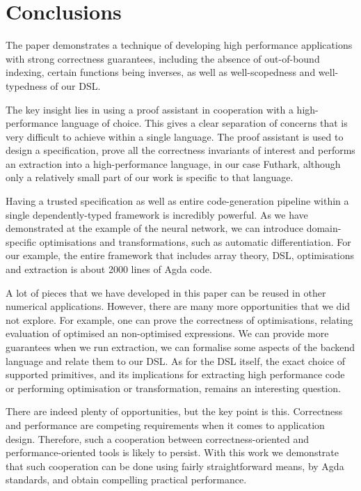 \section{Conclusions\label{sec:conclusions}}

The paper demonstrates a technique of developing high performance
applications with strong correctness guarantees, including the absence
of out-of-bound indexing, certain functions being inverses, as well as
well-scopedness and well-typedness of our DSL.

The key insight lies in using a proof assistant in cooperation with a
high-performance language of choice. This gives a clear separation of
concerns that is very difficult to achieve within a single language.
The proof assistant is used to design a specification, prove all the
correctness invariants of interest and performs an extraction into a
high-performance language, in our case Futhark, although only a
relatively small part of our work is specific to that language.

Having a trusted specification as well as entire code-generation
pipeline within a single dependently-typed framework is incredibly
powerful. As we have demonstrated at the example of the neural
network, we can introduce domain-specific optimisations and
transformations, such as automatic differentiation. For our example,
the entire framework that includes array theory, DSL, optimisations
and extraction is about 2000 lines of Agda code.

A lot of pieces that we have developed in this paper can be reused in
other numerical applications. However, there are many more
opportunities that we did not explore. For example, one can prove the
correctness of optimisations, relating evaluation of optimised an
non-optimised expressions. We can provide more guarantees when we run
extraction, \eg{} we can formalise some aspects of the backend
language and relate them to our DSL. As for the DSL itself, the exact
choice of supported primitives, and its implications for extracting
high performance code or performing optimisation or transformation,
remains an interesting question.

There are indeed plenty of opportunities, but the key point is this.
Correctness and performance are competing requirements when it comes
to application design. Therefore, such a cooperation between
correctness-oriented and performance-oriented tools is likely to
persist. With this work we demonstrate that such cooperation can be
done using fairly straightforward means, by Agda standards, and obtain
compelling practical performance.
